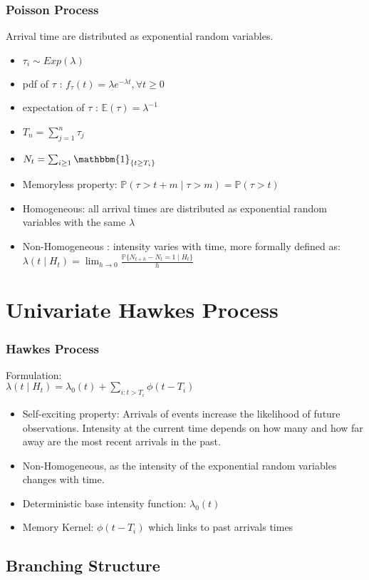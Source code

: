\documentclass{beamer}
\begin{document}
\begin{frame}
\frametitle{Poisson Process}
Arrival time are distributed as exponential random variables.
\begin{itemize}
	\item $\tau_i \sim Exp(\lambda)$
	\item pdf of $\tau$ : $f_{\tau}(t) = \lambda e^{-\lambda t}, \forall t \ge 0$
	\item expectation of $\tau$ : $\mathbb{E}(\tau) = \lambda^{-1}$
	\item $T_n = \sum_{j=1}^n \tau_j$
	\item $N_t = \sum_{i \ge 1} \mathbbm{1}_{\{ t \ge T_i\}}$
	\item Memoryless property: $\mathbb{P}(\tau > t + m \mid \tau > m) = \mathbb{P}(\tau > t)$
	\item Homogeneous: all arrival times are distributed as exponential random variables with the same $\lambda$
	\item Non-Homogeneous : intensity varies with time, more formally defined as: $\lambda(t \mid H_t) = \lim_{h \to 0} \frac{\mathbb{P}\{ N_{t + h} - N_t = 1 \mid H_t\}}{h}$
\end{itemize}
\end{frame}

\section{Univariate Hawkes Process}

\begin{frame}
\frametitle{Hawkes Process}
Formulation:\\
$\lambda(t \mid H_t) = \lambda_0(t) + \sum_{i: t > T_i} \phi(t - T_i)$
\begin{itemize}
	\item Self-exciting property: Arrivals of events increase the likelihood of future observations. Intensity at the current time depends on how many and how far away are the most recent arrivals in the past.
	\item Non-Homogeneous, as the intensity of the exponential random variables changes with time.
	\item Deterministic base intensity function: $\lambda_0(t)$
	\item Memory Kernel: $\phi(t - T_i)$ which links to past arrivals times
\end{itemize}
\end{frame}

\subsection{Branching Structure}
\end{document}
